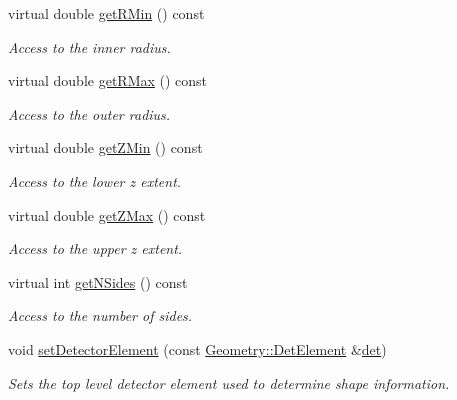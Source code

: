 \begin{DoxyCompactItemize}
virtual double \hyperlink{class_d_d4hep_1_1_d_d_rec_1_1_subdetector_extension_impl_a9d9223f2ac1531aca259385ee8da198d}{getRMin} () const 
\begin{DoxyCompactList}\small\item\em Access to the inner radius. \item\end{DoxyCompactList}\item 
virtual double \hyperlink{class_d_d4hep_1_1_d_d_rec_1_1_subdetector_extension_impl_a2d3822620caa0a681d124f2219c6e451}{getRMax} () const 
\begin{DoxyCompactList}\small\item\em Access to the outer radius. \item\end{DoxyCompactList}\item 
virtual double \hyperlink{class_d_d4hep_1_1_d_d_rec_1_1_subdetector_extension_impl_afe7437d86975e37f4b81e61631145591}{getZMin} () const 
\begin{DoxyCompactList}\small\item\em Access to the lower z extent. \item\end{DoxyCompactList}\item 
virtual double \hyperlink{class_d_d4hep_1_1_d_d_rec_1_1_subdetector_extension_impl_aba14e772e28306fd9692a11e1940c51b}{getZMax} () const 
\begin{DoxyCompactList}\small\item\em Access to the upper z extent. \item\end{DoxyCompactList}\item 
virtual int \hyperlink{class_d_d4hep_1_1_d_d_rec_1_1_subdetector_extension_impl_ac5bedd13a416dcf18730ce3eb23e2ee0}{getNSides} () const 
\begin{DoxyCompactList}\small\item\em Access to the number of sides. \item\end{DoxyCompactList}\item 
void \hyperlink{class_d_d4hep_1_1_d_d_rec_1_1_subdetector_extension_impl_a6b2e5282d0f58128a056e95459d61939}{setDetectorElement} (const \hyperlink{class_d_d4hep_1_1_geometry_1_1_det_element}{Geometry::DetElement} \&\hyperlink{class_d_d4hep_1_1_d_d_rec_1_1_subdetector_extension_impl_a5573895361adac8070eb23454538d76e}{det})
\begin{DoxyCompactList}\small\item\em Sets the top level detector element used to determine shape information. \item\end{DoxyCompactList}\item 

\end{DoxyCompactItemize}
